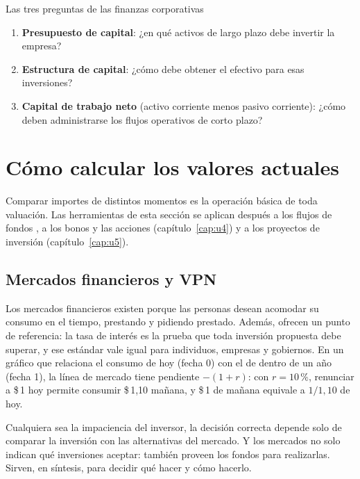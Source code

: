 \begin{definicion}{Las tres preguntas de las finanzas corporativas}
\begin{enumerate}
\item \textbf{Presupuesto de capital}: ¿en qué activos de largo plazo debe invertir la empresa?
\item \textbf{Estructura de capital}: ¿cómo debe obtener el efectivo para esas inversiones?
\item \textbf{Capital de trabajo neto} (activo corriente menos pasivo corriente): ¿cómo deben administrarse los flujos operativos de corto plazo?
\end{enumerate}
\end{definicion}

\section{Cómo calcular los valores actuales}\label{sec:u1-va}

Comparar importes de distintos momentos es la operación básica de toda valuación. Las herramientas de esta sección se aplican después a los flujos de fondos , a los bonos y las acciones (capítulo~\ref{cap:u4}) y a los proyectos de inversión (capítulo~\ref{cap:u5}).

\subsection{Mercados financieros y VPN}

Los mercados financieros existen porque las personas desean acomodar su consumo en el tiempo, prestando y pidiendo prestado. Además, ofrecen un punto de referencia: la tasa de interés es la prueba que toda inversión propuesta debe superar, y ese estándar vale igual para individuos, empresas y gobiernos. En un gráfico que relaciona el consumo de hoy (fecha 0) con el de dentro de un año (fecha 1), la línea de mercado tiene pendiente $-(1+r)$: con $r = 10\,\%$, renunciar a \$\,1 hoy permite consumir \$\,1,10 mañana, y \$\,1 de mañana equivale a $1/1{,}10$ de hoy.

Cualquiera sea la impaciencia del inversor, la decisión correcta depende solo de comparar la inversión con las alternativas del mercado. Y los mercados no solo indican qué inversiones aceptar: también proveen los fondos para realizarlas. Sirven, en síntesis, para decidir qué hacer y cómo hacerlo.

